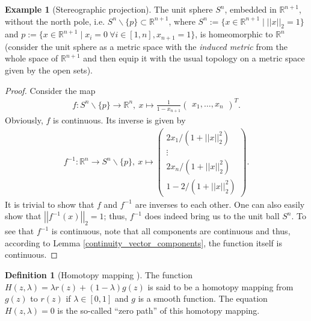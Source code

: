 \documentclass[12pt, a4paper]{article}
\numberwithin{equation}{section}
\theoremstyle{definition}
\theoremstyle{definition}
\newtheorem{defn}[thm]{Definition} %
\newtheorem{exmp}[thm]{Example} %
\newcommand{\norm}[2]{\left\vert\left\vert #1 \right\vert\right\vert_{#2}}
\begin{document}
	\begin{exmp}[Stereographic projection]
		The unit sphere $S^n$, embedded in $\mathbb R^{n+1}$, without the north pole, i.e. $S^n\backslash \{p\} \subset \mathbb R^{n+1}$, where $S^n := \{ x\in\mathbb R^{n+1} \mid \norm{x}{2} = 1 \}$ and $p := \{ x\in\mathbb R^{n+1} \mid x_i = 0 \ \forall i\in[1, n], x_{n+1} = 1 \}$, is homeomorphic to $\mathbb R^n$ (consider the unit sphere as a metric space with the \textit{induced metric} from the whole space of $\mathbb R^{n+1}$ and then equip it with the usual topology on a metric space given by the open sets). 
	\end{exmp}
	\begin{proof}
			Consider the map 
		\begin{align}
			f: S^n\backslash\{p\}\rightarrow \mathbb R^n, \ x\mapsto \frac{1}{1-x_{n+1}}\begin{pmatrix} x_1, \dots, x_n \end{pmatrix}^T. 
		\end{align}
		Obviously, $f$ is continuous. Its inverse is given by 
		\begin{align}\label{stereographic_map_inverse}
			f^{-1}: \mathbb R^n \rightarrow S^n\backslash\{p\}, \ x\mapsto \begin{pmatrix} 2x_1/ \left(1+\norm{x}{2}^2\right)\\ \vdots\\ 2x_n/\left(1+\norm{x}{2}^2\right) \\[4pt] 1-2/\left(1+\norm{x}{2}^2\right) \end{pmatrix}.  
		\end{align}
		It is trivial to show that $f$ and $f^{-1}$ are inverses to each other. One can also easily show that $\norm{f^{-1}(x)}{2} = 1$; thus, $f^{-1}$ does indeed bring us to the unit ball $S^n$. 
		To see that $f^{-1}$ is continuous, note that all components are continuous and thus, according to Lemma \ref{continuity_vector_components}, the function itself is continuous. 
	\end{proof} 
	
	\begin{defn}[Homotopy mapping \cite{ding2023sides}]
		The function $H(z, \lambda) = \lambda r(z) + (1 - \lambda) g(z)$ is said to be a homotopy mapping from $g(z)$ to $r(z)$ if $\lambda\in [0, 1]$ and $g$ is a smooth function. The equation $H(z, \lambda) = 0$ is the so-called \enquote{zero path} of this homotopy mapping.
	\end{defn}
	
	\newpage 
\end{document}
